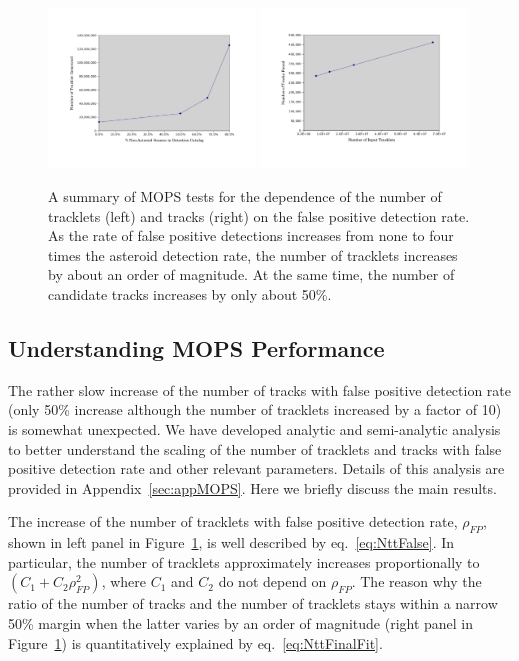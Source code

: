 \begin{figure}[t!]
\centering
\vskip -0.3in
\includegraphics[width=0.49\textwidth]{figures/tracklet}
\includegraphics[width=0.49\textwidth]{figures/tracks}
\vskip -0.5in
\caption{A summary of MOPS tests for the dependence of the number of tracklets (left) 
and tracks (right) on the false positive detection rate. As the rate of false positive detections 
increases from none to four times the asteroid detection rate, the number of tracklets 
increases by about an order of magnitude. At the same time, the number of candidate 
tracks increases by only about 50\%. 
\label{fig:MOPStests}}
\end{figure}




\subsection{Understanding MOPS Performance} 

The rather slow increase of the number of tracks with false positive detection rate (only 50\% increase 
although the number of tracklets increased by a factor of 10) is somewhat unexpected. We have 
developed analytic and semi-analytic analysis to better understand the scaling of the number of 
tracklets and tracks with false positive detection rate and other relevant parameters. Details of this
analysis are provided in Appendix~\ref{sec:appMOPS}. Here we briefly discuss the main results. 

The increase of the number of tracklets with false positive detection rate, $\rho_{FP}$, shown in left panel
in Figure~\ref{fig:MOPStests}, is well described by eq.~\ref{eq:NttFalse}. In particular, the number of tracklets 
approximately increases proportionally to $(C_1 + C_2\rho_{FP}^2)$, where $C_1$ and $C_2$ do not
depend on $\rho_{FP}$. The reason why the ratio of the number of tracks and the number of tracklets
stays within a narrow 50\% margin when the latter varies by an order of magnitude (right panel
in Figure~\ref{fig:MOPStests}) is quantitatively explained by eq.~\ref{eq:NttFinalFit}. 

